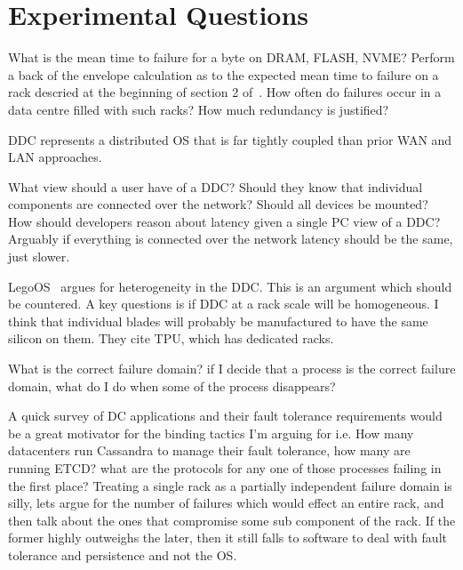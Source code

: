 \section{Experimental Questions}
\label{sec:experiment}

What is the mean time to failure for a byte on DRAM, FLASH, NVME? Perform a
back of the envelope calculation as to the expected mean time to failure on a
rack descried at the beginning of section 2 of~\cite{189914}. How often do
failures occur in a data centre filled with such racks? How much redundancy is
justified?

DDC represents a distributed OS that is far tightly coupled than prior WAN and
LAN approaches.

What view should a user have of a DDC? Should they know that individual
components are connected over the network? Should all devices be mounted? How
should developers reason about latency given a single PC view of a DDC?
Arguably if everything is connected over the network latency should be the
same, just slower.

LegoOS~\cite{legoos} argues for heterogeneity in the DDC. This is an argument
which should be countered. A key questions is if DDC at a rack scale will be
homogeneous. I think that individual blades will probably be manufactured to
have the same silicon on them. They cite TPU, which has dedicated racks.

What is the correct failure domain? if I decide that a process is the correct
failure domain, what do I do when some of the process disappears? 

A quick survey of DC applications and their fault tolerance requirements would
be a great motivator for the binding tactics I'm arguing for i.e. How many
datacenters run Cassandra to manage their fault tolerance, how many are
running ETCD? what are the protocols for any one of those processes failing in
the first place? Treating a single rack as a partially independent failure
domain is silly, lets argue for the number of failures which would effect an
entire rack, and then talk about the ones that compromise some sub component of
the rack. If the former highly outweighs the later, then it still falls to
software to deal with fault tolerance and persistence and not the OS.

